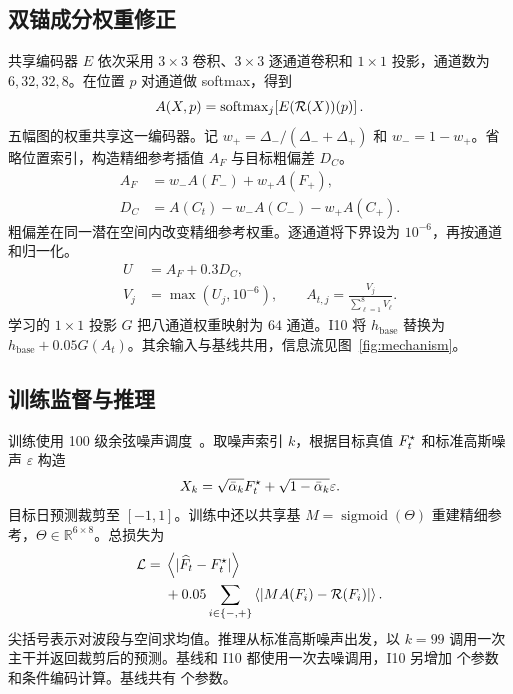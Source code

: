 \documentclass[a4paper,10pt,twocolumn]{article}
\begin{document}
\subsection{双锚成分权重修正}
共享编码器 $E$ 依次采用 $3\times3$ 卷积、$3\times3$ 逐通道卷积和 $1\times1$ 投影，通道数为 $6,32,32,8$。在位置 $p$ 对通道做 softmax，得到
\begin{equation}
 A(X,p)=\operatorname{softmax}_{j}\!\left[E(\mathcal R(X))(p)\right].
 \label{eq:weights}
\end{equation}
五幅图的权重共享这一编码器。记 $w_+=\Delta_-/(\Delta_-+\Delta_+)$ 和 $w_-=1-w_+$。省略位置索引，构造精细参考插值 $A_F$ 与目标粗偏差 $D_C$。
\begin{align}
 A_F &= w_-A(F_-)+w_+A(F_+),\\
 D_C &= A(C_t)-w_-A(C_-)-w_+A(C_+).
 \label{eq:coarse}
\end{align}
粗偏差在同一潜在空间内改变精细参考权重。逐通道将下界设为 $10^{-6}$，再按通道和归一化。
\begin{align}
 U&=A_F+0.3D_C,\\
 V_j&=\max(U_j,10^{-6}),\qquad
 A_{t,j}=\frac{V_j}{\sum_{\ell=1}^8 V_\ell}.
 \label{eq:transfer}
\end{align}
学习的 $1\times1$ 投影 $G$ 把八通道权重映射为 $64$ 通道。I10 将 $h_{\mathrm{base}}$ 替换为 $h_{\mathrm{base}}+0.05G(A_t)$。其余输入与基线共用，信息流见图~\ref{fig:mechanism}。

\subsection{训练监督与推理}
训练使用 100 级余弦噪声调度~\citep{nichol2021improved}。取噪声索引 $k$，根据目标真值 $F_t^\star$ 和标准高斯噪声 $\varepsilon$ 构造
\begin{equation}
 X_k=\sqrt{\bar\alpha_k}F_t^\star+\sqrt{1-\bar\alpha_k}\varepsilon.
\end{equation}
目标日预测裁剪至 $[-1,1]$。训练中还以共享基 $M=\operatorname{sigmoid}(\Theta)$ 重建精细参考，$\Theta\in\mathbb R^{6\times8}$。总损失为
\begin{align}
 \mathcal L={}&\left\langle |\widehat F_t-F_t^\star| \right\rangle\\
 &+0.05\sum_{i\in\{-,+\}}
  \left\langle |M A(F_i)-\mathcal R(F_i)| \right\rangle.
 \label{eq:objective}
\end{align}
尖括号表示对波段与空间求均值。推理从标准高斯噪声出发，以 $k=99$ 调用一次主干并返回裁剪后的预测。基线和 I10 都使用一次去噪调用，I10 另增加 \ExtraParameters{} 个参数和条件编码计算。基线共有 \BaseParameters{} 个参数。
\end{document}
